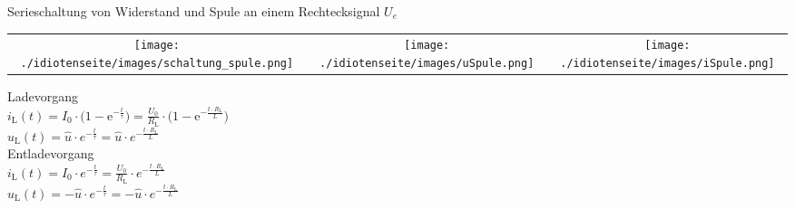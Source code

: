 Serieschaltung von Widerstand und Spule an einem Rechtecksignal $U_e$\\
\begin{tabular}{ccc} 
	\texttt{[image: ./idiotenseite/images/schaltung\_spule.png]} &
	\texttt{[image: ./idiotenseite/images/uSpule.png]} &
	\texttt{[image: ./idiotenseite/images/iSpule.png]}\\	
\end{tabular}
\begin{multicols}{2}
	Ladevorgang\\
	$i_{\mathrm{L}} (t) = I_0 \cdot \biggl(1 - \mathrm{e}^{-
	\frac{t}{\tau}}\biggr) = \frac{U_0}{R_{\mathrm{L}}} \cdot \biggl(1 -
	\mathrm{e}^{- \frac{t \cdot R_{\mathrm{L}}}{L}}\biggr)$\\
	$u_{\mathrm{L}} (t) = \hat u \cdot e^{- \frac{t}{\tau}} = \hat u \cdot e^{-
	\frac{t \cdot R_{\mathrm{L}}}{L}}$\\
	\newline
	Entladevorgang\\
	$i_{\mathrm{L}} (t) = I_0 \cdot e^{- \frac{t}{\tau}} =
	\frac{U_0}{R_{\mathrm{L}}} \cdot e^{- \frac{t \cdot
	R_{\mathrm{L}}}{L}}$\\
	$u_{\mathrm{L}} (t) = - \hat u \cdot e^{- \frac{t}{\tau}} = - \hat u \cdot
	e^{- \frac{t \cdot R_{\mathrm{L}}}{L}}$\\
\end{multicols}


